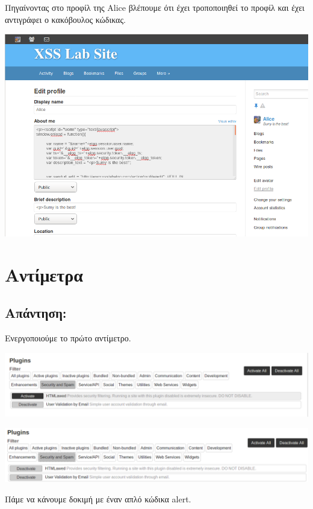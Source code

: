 \noindent
Πηγαίνοντας στο προφίλ της Alice βλέπουμε ότι έχει τροποποιηθεί το προφίλ
και έχει αντιγράφει ο κακόβουλος κώδικας.
\begin{center}
			\includegraphics[width=1\textwidth]{image/6.12.PNG}		
\end{center}
\section{Αντίμετρα}
\subsection*{Απάντηση:}

\noindent
Ενεργοποιούμε το πρώτο αντίμετρο.
\begin{center}
			\includegraphics[width=1\textwidth]{image/7.1.PNG}		
\end{center}

\begin{center}
			\includegraphics[width=1\textwidth]{image/7.2.PNG}		
\end{center}

\noindent
Πάμε να κάνουμε δοκιμή με έναν απλό κώδικα alert.

